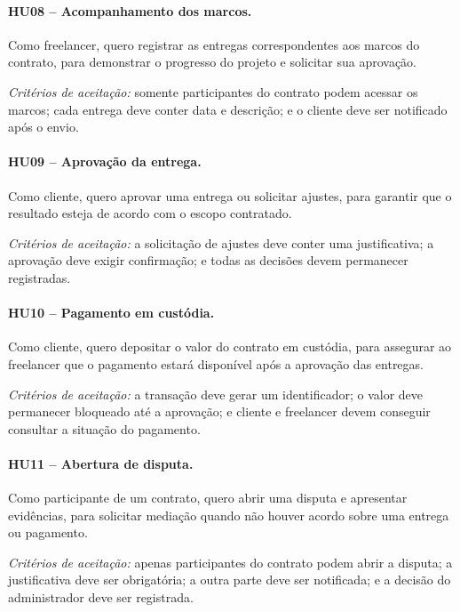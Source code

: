 \documentclass[portuguese]{sbcreviews-2025}
\begin{document}
\paragraph{HU08 -- Acompanhamento dos marcos.}

Como freelancer, quero registrar as entregas correspondentes aos
marcos do contrato, para demonstrar o progresso do projeto e
solicitar sua aprovação.

\textit{Critérios de aceitação:} somente participantes do contrato
podem acessar os marcos; cada entrega deve conter data e descrição;
e o cliente deve ser notificado após o envio.

\paragraph{HU09 -- Aprovação da entrega.}

Como cliente, quero aprovar uma entrega ou solicitar ajustes, para
garantir que o resultado esteja de acordo com o escopo contratado.

\textit{Critérios de aceitação:} a solicitação de ajustes deve
conter uma justificativa; a aprovação deve exigir confirmação; e
todas as decisões devem permanecer registradas.

\paragraph{HU10 -- Pagamento em custódia.}

Como cliente, quero depositar o valor do contrato em custódia, para
assegurar ao freelancer que o pagamento estará disponível após a
aprovação das entregas.

\textit{Critérios de aceitação:} a transação deve gerar um
identificador; o valor deve permanecer bloqueado até a aprovação; e
cliente e freelancer devem conseguir consultar a situação do
pagamento.

\paragraph{HU11 -- Abertura de disputa.}

Como participante de um contrato, quero abrir uma disputa e
apresentar evidências, para solicitar mediação quando não houver
acordo sobre uma entrega ou pagamento.

\textit{Critérios de aceitação:} apenas participantes do contrato
podem abrir a disputa; a justificativa deve ser obrigatória; a outra
parte deve ser notificada; e a decisão do administrador deve ser
registrada.
\end{document}
